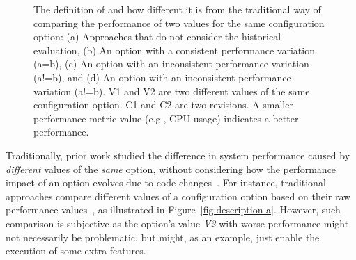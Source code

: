 \begin{figure}[t]
\begin{subfigure}{0.22\textwidth}
                \label{fig:description-d}
        \end{subfigure}%
	\caption{%
	The definition of \inconsistent and how different it is from the traditional way of comparing the performance of two values for the same configuration option: (a) Approaches that do not consider the historical evaluation, (b) An option with a consistent performance variation (a=b), (c) An option with an inconsistent performance variation (a!=b), and (d) An option with an inconsistent performance variation (a!=b). V1 and V2 are two different values of the same configuration option. C1 and C2 are two revisions. A smaller performance metric value (e.g., CPU usage) indicates a better performance.
	}
	\label{fig:description}
\end{figure}



Traditionally, prior work studied the difference in system performance caused by \emph{different} values of the \emph{same} option, without considering how the performance impact of an option evolves due to code changes~\cite{tse}. For instance, traditional approaches compare different values of a configuration option based on their raw performance values~\cite{RN2880,RN3537,RN3543}, as illustrated in Figure~\ref{fig:description-a}. However, such comparison is subjective as
the option's value \emph{V2} with worse performance might not necessarily be problematic, but might, as an example, just enable the execution of some extra features.

